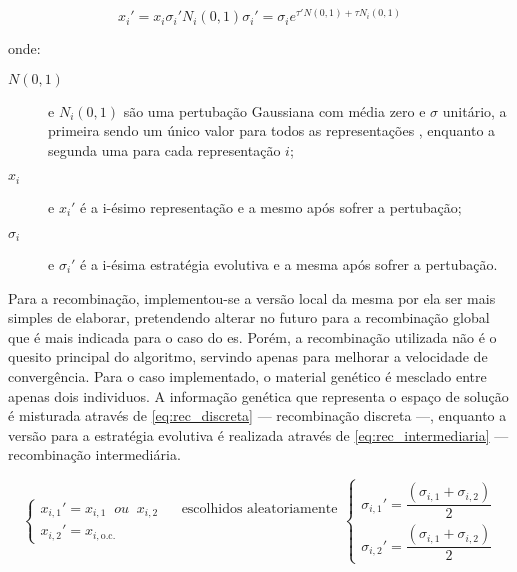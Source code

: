 \begin{subequations}
\begin{equation}\label{eq:s_esbegin}
x_i' = x_i\sigma_i'N_i(0,1)
\end{equation}
\begin{equation}\label{eq:sigma_esbegin}
\sigma_i' = \sigma_ie^{\tau'N(0,1)+\tau N_i(0,1)}
\end{equation}
\end{subequations}

\noindent onde: 

\begin{description}
\item[$N(0,1)$] e $N_i(0,1)$ são uma pertubação Gaussiana com média
zero e $\sigma$ unitário, a primeira sendo um único valor para todos
as representações , enquanto a segunda uma para cada representação $i$; 
\item[$x_i$] e $x_i'$ é a i-ésimo representação e a mesmo após sofrer a
pertubação;
\item[$\sigma_i$] e $\sigma_i'$ é a i-ésima estratégia evolutiva e a
mesma após sofrer a pertubação.
\end{description}

Para a recombinação, implementou-se a versão local da mesma por ela
ser mais simples de elaborar, pretendendo alterar no futuro para
a recombinação global que é mais indicada para o caso do \acs{es}.
Porém, a recombinação utilizada não é o quesito principal do
algoritmo, servindo apenas para melhorar a velocidade de convergência.
Para o caso implementado, o material genético é mesclado entre apenas
dois individuos. A informação genética que representa o espaço de
solução é misturada através de \ref{eq:rec_discreta} --- recombinação discreta
---, enquanto a versão para a estratégia evolutiva é realizada através
de \ref{eq:rec_intermediaria} --- recombinação intermediária.

\begin{subequations}
\begin{equation}\label{eq:rec_discreta}
\left\{\begin{array}{l}
x_{i,1}' = x_{i,1} \;\; \textit{ou} \;\; x_{i,2} \;\;\;\;\;\; \text{escolhidos
aleatoriamente}\\
x_{i,2}' = x_{i,\text{o.c.}}
\end{array}\right.
\end{equation}
\begin{equation}\label{eq:rec_intermediaria}
\left\{\begin{array}{l}
\sigma_{i,1}' = \dfrac{(\sigma_{i,1}+\sigma_{i,2})}{2} \\
\sigma_{i,2}' = \dfrac{(\sigma_{i,1}+\sigma_{i,2})}{2}
\end{array}\right.
\end{equation}
\end{subequations}

